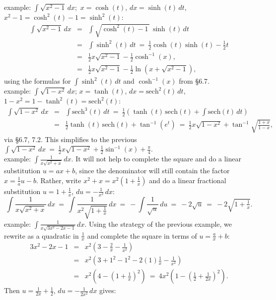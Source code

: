\documentclass[11pt]{article}
\newcommand{\ds}{\displaystyle}
\newcommand{\sech}{\mathrm{sech}}
\begin{document}
\noindent
{\sc example:} $\int\!\!\sqrt{x^2-1}\,dx$;\  $x = \cosh(t)$, $dx = \sinh(t)\,dt$,
$x^2{-}1=\cosh^2(t){-}1=\sinh^2(t)$:
$$\begin{array}{rcl}
\ds\int\!\sqrt{x^2-1}\,dx &=& \ds
\int\!\sqrt{\cosh^2(t){-}1\,}\,\sinh(t)\,dt 
\\[.8em]
&=& \ds
\int\sinh^2(t)\,dt
\ =\  \tfrac12\cosh(t)\sinh(t) - \tfrac12 t
\\[.8em]
&=&  \frac12 x\sqrt{x^2-1} - \frac12 \cosh^{-1}(x),
\\[.8em]
&=& \frac12 x\sqrt{x^2-1} - \frac12 \ln(x+\sqrt{x^2-1}),
\end{array}$$
using  the formulas for $\int\!\sinh^2(t)\,dt$ and $\cosh^{-1}(x)$ from \S6.7.
\\[1.5em]
{\sc example:} $\int\!\!\sqrt{1-x^2}\,dx$;  $x = \tanh(t)$, $dx = \sech^2(t)\,dt$,
$1{-}x^2=1{-}\tanh^2(t)=\sech^2(t)$:
$$\begin{array}{rcl}
\ds\int\!\sqrt{1-x^2}\,dx &=& \ds
\int\!\sech^3(t)\,dt 
\ =\ 
\frac12 \left(\tanh(t)\,\sech(t)+\int\sech(t)\,dt\right)
\\[1.2em]
&=& \ds
\tfrac12\tanh(t)\,\sech(t)+\tan^{-1}(e^t)
\ =\
 \tfrac12 x\sqrt{1{-}x^2} + \tan^{-1}\!\sqrt{\tfrac{1+x}{1-x}},
\end{array}$$
via \S6.7, 7.2. This simplifies to the previous $\int\! \sqrt{1{-}x^2}\,dx \ =\  \tfrac12x\sqrt{1{-}x^2}+\tfrac12\sin^{-1}(x)+\frac\pi4$.
\\[1.5em]
{\sc example:} $\int\!\!\frac{1}{x\sqrt{x^2+x}}\,dx$.
It will not help to complete the square and do a linear substitution $u=ax+b$, 
since the denominator will still contain the factor $x=\frac 1a u-b$. 
Rather, write $x^2+x=x^2(1+\frac1x)$ and do a linear fractional substitution 
$u=1+\frac1x$, $du=-\frac{1}{x^2}\,dx$: 
$$
\int\!\!\frac{1}{x\sqrt{x^2+x}}\,dx \ =\ 
\int\!\!\frac{1}{x^2\sqrt{1+\frac1x}}\,dx \ =\ 
-\int\!\!\frac{1}{\sqrt u}\,du \ =\ 
-2 \sqrt{u} \ = \ -2\sqrt{1+\tfrac1x}.
$$
{\sc example:} $\int\!\!\frac{1}{x\sqrt{3x^2-2x-1}}\,dx$.
Using the strategy of the previous example, 
we rewrite as a quadratic in $\frac1x$ and 
complete the square in terms of $u=\frac ax +b$:
$$\begin{array}{rcl}
3x^2-2x-1 &=& x^2 (3-\frac2x - \frac1{x^2})
\\[1em]
&=& x^2 \left(3+1^2-1^2- 2(1)\frac1x 
-\tfrac{1}{x^2}\right)
\\[1em]
&=& x^2 \left(4-(1 {+} \frac1x)^2\right)
\ =\  4x^2 \left(1-(\frac12 {+} \frac1{2x})^2\right).
\end{array}$$
Then $u=\frac1{2x} +\frac12$, $du = -\frac1{2x^2}\,dx$ gives:
\end{document}
